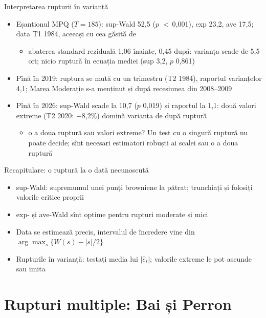\begin{frame}{Interpretarea rupturii în varianță}
\itemsize{\small}
\begin{itemize}
    \item Eșantionul MPQ ($T = 185$): sup-Wald 52{,}5 ($p$ $<$\,0{,}001), exp 23{,}2, ave 17{,}5; data T1 1984, aceeași cu cea găsită de 
    \begin{itemize}
        \item abaterea standard reziduală 1{,}06 înainte, 0{,}45 după: varianța scade de 5{,}5 ori; nicio ruptură în ecuația mediei (sup 3{,}2, $p$ 0{,}861)
    \end{itemize}
    \item Pînă în 2019: ruptura se mută cu un trimestru (T2 1984), raportul varianțelor 4{,}1; Marea Moderație s-a menținut și după recesiunea din 2008--2009
    \item Pînă în 2026: sup-Wald scade la 10{,}7 ($p$ 0{,}019) și raportul la 1{,}1: două valori extreme (T2 2020: \ensuremath{-}8{,}2\%) domină varianța de după ruptură
    \begin{itemize}
        \item o a doua ruptură sau valori extreme? Un test cu o singură ruptură nu poate decide; sînt necesari estimatori robuști ai scalei sau o a doua ruptură
    \end{itemize}
\end{itemize}
\end{frame}

\begin{frame}{Recapitulare: o ruptură la o dată necunoscută}
\itemsize{\small}
\begin{itemize}
    \item sup-Wald: supremumul unei punți browniene la pătrat; trunchiați și folosiți valorile critice proprii
    \item exp- și ave-Wald sînt optime pentru rupturi moderate și mici
    \item Data se estimează precis, intervalul de încredere vine din $\arg\max_s\{W(s) - |s|/2\}$
    \item Rupturile în varianță: testați media lui $|\hat e_t|$; valorile extreme le pot ascunde sau imita
\end{itemize}
\end{frame}


\section{Rupturi multiple: Bai și Perron}

